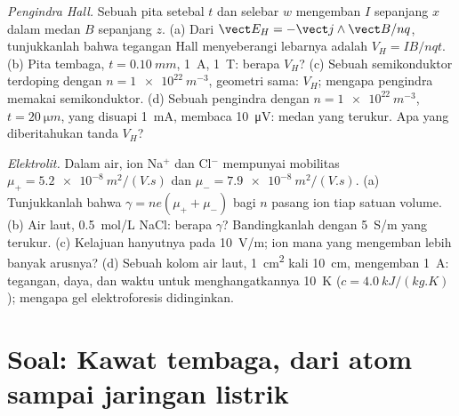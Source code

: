 \begin{exercise}[$\star\star\star$]\label{exo:b2:charges-currents-conduction:11}
\emph{Pengindra Hall.} Sebuah pita setebal $t$ dan selebar $w$ mengemban $I$
sepanjang $x$ dalam medan $B$ sepanjang $z$. (a) Dari $\vect E_H = -\vect j\wedge\vect B
/nq$, tunjukkanlah bahwa tegangan Hall menyeberangi lebarnya adalah $V_H = IB/nqt$. (b)
Pita tembaga, $t = \qty{0.10}{mm}$, \qty{1}{A}, \qty{1}{T}: berapa $V_H$? (c) Sebuah
semikonduktor terdoping dengan $n = \qty{1e22}{m^{-3}}$, geometri sama: $V_H$; mengapa
pengindra memakai semikonduktor. (d) Sebuah pengindra dengan $n = \qty{1e22}{m^{-3}}$, $t =
\qty{20}{\micro m}$, yang disuapi \qty{1}{mA}, membaca \qty{10}{\micro V}: medan yang terukur.
Apa yang diberitahukan tanda $V_H$?
\end{exercise}

\begin{exercise}[$\star\star\star$]\label{exo:b2:charges-currents-conduction:12}
\emph{Elektrolit.} Dalam air, ion Na$^+$ dan Cl$^-$ mempunyai mobilitas
$\mu_+ = \qty{5.2e-8}{m^2/(V.s)}$ dan $\mu_- = \qty{7.9e-8}{m^2/(V.s)}$. (a)
Tunjukkanlah bahwa $\gamma = ne(\mu_+ + \mu_-)$ bagi $n$ pasang ion tiap satuan volume.
(b) Air laut, \qty{0.5}{mol/L} NaCl: berapa $\gamma$? Bandingkanlah dengan
\qty{5}{S/m} yang terukur. (c) Kelajuan hanyutnya pada \qty{10}{V/m}; ion mana yang mengemban lebih banyak
arusnya? (d) Sebuah kolom air laut, \qty{1}{cm^2} kali \qty{10}{cm}, mengemban
\qty{1}{A}: tegangan, daya, dan waktu untuk menghangatkannya \qty{10}{K} ($c =
\qty{4.0}{kJ/(kg.K)}$); mengapa gel elektroforesis didinginkan.
\end{exercise}

\section{Soal: Kawat tembaga, dari atom sampai jaringan listrik}

